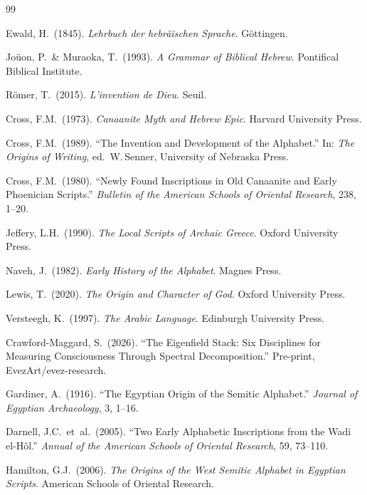 \documentclass[12pt]{article}
\begin{document}
\begin{thebibliography}{99}

Ewald, H.~(1845). \textit{Lehrbuch der hebr\"aischen Sprache}. G\"ottingen.

Jo\"uon, P.\ \& Muraoka, T.~(1993). \textit{A Grammar of Biblical Hebrew}. Pontifical Biblical Institute.

R\"omer, T.~(2015). \textit{L'invention de Dieu}. Seuil.

Cross, F.M.~(1973). \textit{Canaanite Myth and Hebrew Epic}. Harvard University Press.

Cross, F.M.~(1989). ``The Invention and Development of the Alphabet.'' In: \textit{The Origins of Writing}, ed.\ W.\,Senner, University of Nebraska Press.

Cross, F.M.~(1980). ``Newly Found Inscriptions in Old Canaanite and Early Phoenician Scripts.'' \textit{Bulletin of the American Schools of Oriental Research}, 238, 1--20.

Jeffery, L.H.~(1990). \textit{The Local Scripts of Archaic Greece}. Oxford University Press.

Naveh, J.~(1982). \textit{Early History of the Alphabet}. Magnes Press.

Lewis, T.~(2020). \textit{The Origin and Character of God}. Oxford University Press.

Versteegh, K.~(1997). \textit{The Arabic Language}. Edinburgh University Press.

Crawford-Maggard, S.~(2026). ``The Eigenfield Stack: Six Disciplines for Measuring Consciousness Through Spectral Decomposition.'' Pre-print, EvezArt/evez-research.

Gardiner, A.~(1916). ``The Egyptian Origin of the Semitic Alphabet.'' \textit{Journal of Egyptian Archaeology}, 3, 1--16.

Darnell, J.C.\ et~al.~(2005). ``Two Early Alphabetic Inscriptions from the Wadi el-H\^ol.'' \textit{Annual of the American Schools of Oriental Research}, 59, 73--110.

Hamilton, G.J.~(2006). \textit{The Origins of the West Semitic Alphabet in Egyptian Scripts}. American Schools of Oriental Research.

\end{thebibliography}
\end{document}
